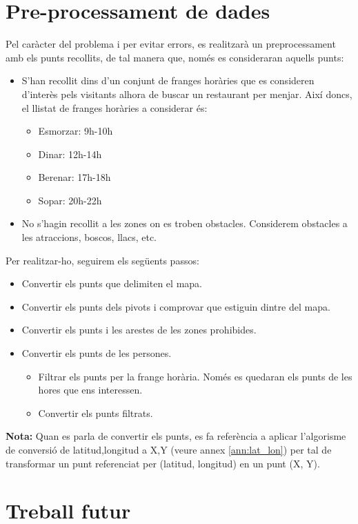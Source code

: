 \documentclass[12pt]{article}
\begin{document}
\clearpage
\section{Pre-processament de dades\label{pd}}
Pel caràcter del problema i per evitar errors, es realitzarà un preprocessament amb els punts recollits, de tal manera que, només es consideraran aquells punts:
\begin{itemize}
	\item S’han recollit dins d’un conjunt de franges horàries que es consideren d'interès pels visitants alhora de buscar un restaurant per menjar. 
	Així doncs, el llistat de franges horàries a considerar és:
	\begin{itemize}
		\item Esmorzar: 9h-10h
		\item Dinar: 12h-14h
		\item Berenar: 17h-18h
		\item Sopar: 20h-22h
	\end{itemize}

	\item No s’hagin recollit a les zones on es troben obstacles. 
	Considerem obstacles a les atraccions, boscos, llacs, etc.
\end{itemize}

Per realitzar-ho, seguirem els següents passos:
\begin{itemize}
	\item Convertir els punts que delimiten el mapa.
	\item Convertir els punts dels pivots i comprovar que estiguin dintre del mapa.
	\item Convertir els punts i les arestes de les zones prohibides.
	\item Convertir els punts de les persones.
	\begin{itemize}
		\item Filtrar els punts per la frange horària. Només es quedaran els punts de les hores que ens interessen.
		\item Convertir els punts filtrats.
	\end{itemize}
\end{itemize}

\textbf{Nota:} Quan es parla de convertir els punts, es fa referència a aplicar l'algorisme de conversió de latitud,longitud a X,Y (veure annex \ref{ann:lat_lon}) per tal de transformar un punt referenciat per (latitud, longitud) en un punt (X, Y).

\clearpage
\section{Treball futur}
\end{document}
